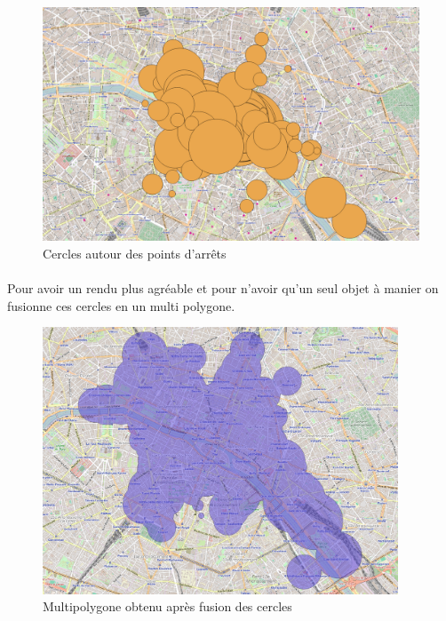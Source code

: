 \documentclass[a4paper]{report}
\begin{document}
\begin{figure}[H]
	\begin{center}
		\includegraphics[width=400pt]{image/premiers_isochrones}
		\caption{Cercles autour des points d'arrêts}
		\label{Cercles autour des points d'arrêts}
	\end{center}
\end{figure}

\paragraph{} Pour avoir un rendu plus agréable et pour n'avoir qu'un seul objet à manier on fusionne ces cercles en un multi polygone.

\begin{figure}[H]
	\begin{center}
		\includegraphics[width=300pt]{image/iso_merged}
		\caption{Multipolygone obtenu après fusion des cercles}
		\label{Multipolygone obtenu après fusion des cercles}
	\end{center}
\end{figure}
\end{document}
